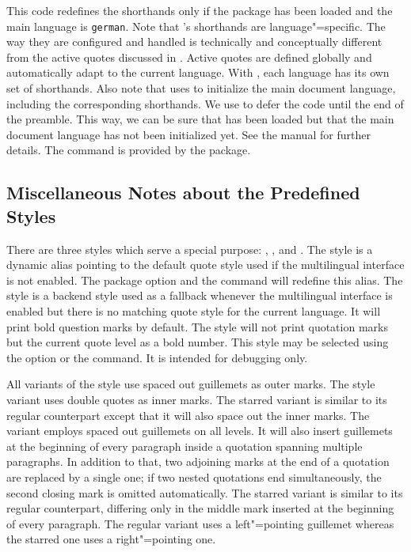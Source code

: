 \documentclass{ltxdockit}[2010/09/26]
\begin{document}
\begin{ltxcode}[upquote]
\end{ltxcode}
%
This code redefines the shorthands only if the  package has been loaded and the main language is \texttt{german}. Note that 's shorthands are language"=specific. The way they are configured and handled is technically and conceptually different from the active quotes discussed in . Active quotes are defined globally and automatically adapt to the current language. With , each language has its own set of shorthands. Also note that  uses  to initialize the main document language, including the corresponding shorthands. We use  to defer the code until the end of the preamble. This way, we can be sure that  has been loaded but that the main document language has not been initialized yet. See the  manual for further details. The  command is provided by the  package.

\subsection{Miscellaneous Notes about the Predefined Styles}
\label{hnt:pre}

There are three styles which serve a special purpose: , , and . The  style is a dynamic alias pointing to the default quote style used if the multilingual interface is not enabled. The package option  and the command  will redefine this alias. The  style is a backend style used as a fallback whenever the multilingual interface is enabled but there is no matching quote style for the current language. It will print bold question marks by default. The  style will not print quotation marks but the current quote level as a bold number. This style may be selected using the  option or the  command. It is intended for debugging only.

All variants of the  style use spaced out guillemets as outer marks. The style variant  uses double quotes as inner marks. The starred variant  is similar to its regular counterpart except that it will also space out the inner marks. The  variant employs spaced out guillemets on all levels. It will also insert guillemets at the beginning of every paragraph inside a quotation spanning multiple paragraphs. In addition to that, two adjoining marks at the end of a quotation are replaced by a single one; if two nested quotations end simultaneously, the second closing mark is omitted automatically. The starred variant  is similar to its regular counterpart, differing only in the middle mark inserted at the beginning of every paragraph. The regular variant uses a left"=pointing guillemet whereas the starred one uses a right"=pointing one.
\end{document}
